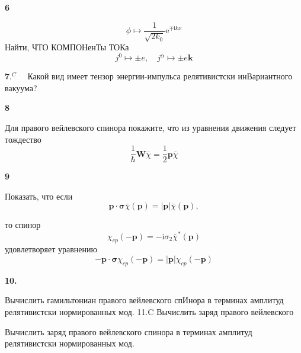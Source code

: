 \documentclass[a4paper,12pt]{article} %
\begin{document}
\begin{ttask}\textbf{6}


$$
\phi \mapsto \frac{1}{\sqrt{2 k_{0}}} \mathrm{e}^{\mp \mathrm{i} k x}
$$
Найти, ЧТО КОМПОНенТы ТОКа
$$
j^{0} \mapsto \pm e, \quad j^{\alpha} \mapsto \pm e \boldsymbol{k}
$$


\end{ttask}



\begin{ttask}

$\mathbf{7} .^{C} \quad$ Какой вид имеет тензор энергии-импульса релятивистски инВариантного вакуума?


\end{ttask}



\begin{ttask}\textbf{8}


Для правого вейлевского спинора покажите, что из уравнения движения следует тождество
$$
\frac{1}{\hbar} \boldsymbol{W} \bar{\chi}=\frac{1}{2} \boldsymbol{p} \bar{\chi}
$$






\end{ttask}



\begin{ttask}\textbf{9}


Показать, что если
$$
\boldsymbol{p} \cdot \boldsymbol{\sigma} \bar{\chi}(\boldsymbol{p})=|\boldsymbol{p}| \bar{\chi}(\boldsymbol{p}),
$$

то спинор
$$
\chi_{c p}(-\boldsymbol{p})=-\mathrm{i} \sigma_{2} \bar{\chi}^{*}(\boldsymbol{p})
$$
удовлетворяет уравнению
$$
-\boldsymbol{p} \cdot \boldsymbol{\sigma} \chi_{c p}(-\boldsymbol{p})=|\boldsymbol{p}| \chi_{c p}(-\boldsymbol{p})
$$


\end{ttask}



\begin{ttask} \textbf{10.}
	
	 
Вычислить гамильтониан правого вейлевского спИнора в терминах амплитуд релятивистски нормированных мод. 11.C 
Вычислить заряд правого вейлевского 



\end{ttask}



\begin{ttask}

Вычислить заряд правого вейлевского спинора в терминах амплитуд релятивистски нормированных мод.





\end{ttask}
\end{document}
